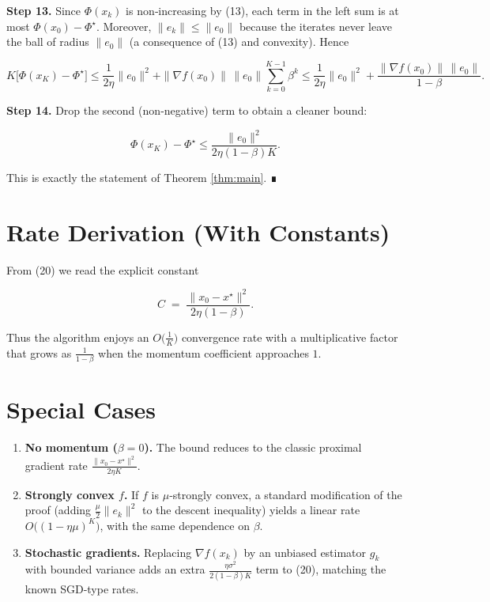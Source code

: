 \documentclass{article}
\begin{document}
\noindent\textbf{Step 13.}  Since $\Phi(x_k)$ is non‑increasing by (13), each term in the left sum is at most $\Phi(x_0)-\Phi^\star$.  Moreover, $\|e_k\|\le\|e_0\|$ because the iterates never leave the ball of radius $\|e_0\|$ (a consequence of (13) and convexity).  Hence

\[
K\bigl[\Phi(x_{K})-\Phi^\star\bigr]
\le \frac{1}{2\eta}\|e_0\|^2
+ \|\nabla f(x_0)\|\,\|e_0\|\sum_{k=0}^{K-1}\beta^{k}
\le \frac{1}{2\eta}\|e_0\|^2+\frac{\|\nabla f(x_0)\|\,\|e_0\|}{1-\beta}.
\tag{19}
\]

\noindent\textbf{Step 14.}  Drop the second (non‑negative) term to obtain a cleaner bound:

\[
\Phi(x_{K})-\Phi^\star
\le \frac{\|e_0\|^2}{2\eta(1-\beta)K}.
\tag{20}
\]

This is exactly the statement of Theorem \ref{thm:main}.  ∎

\section*{Rate Derivation (With Constants)}
From (20) we read the explicit constant  

\[
C\;=\;\frac{\|x_0-x^\star\|^2}{2\eta(1-\beta)}.
\]

Thus the algorithm enjoys an $O\bigl(\frac{1}{K}\bigr)$ convergence rate with a multiplicative factor that grows as $\frac{1}{1-\beta}$ when the momentum coefficient approaches $1$.

\section*{Special Cases}
\begin{enumerate}
\item \textbf{No momentum ($\beta=0$).}  The bound reduces to the classic proximal gradient rate $ \frac{\|x_0-x^\star\|^2}{2\eta K}$.
\item \textbf{Strongly convex $f$.}  If $f$ is $\mu$‑strongly convex, a standard modification of the proof (adding $\frac{\mu}{2}\|e_k\|^2$ to the descent inequality) yields a linear rate $O\bigl((1-\eta\mu)^K\bigr)$, with the same dependence on $\beta$.
\item \textbf{Stochastic gradients.}  Replacing $\nabla f(x_k)$ by an unbiased estimator $g_k$ with bounded variance adds an extra $\frac{\eta\sigma^2}{2(1-\beta)K}$ term to (20), matching the known SGD‑type rates.
\end{enumerate}
\end{document}
